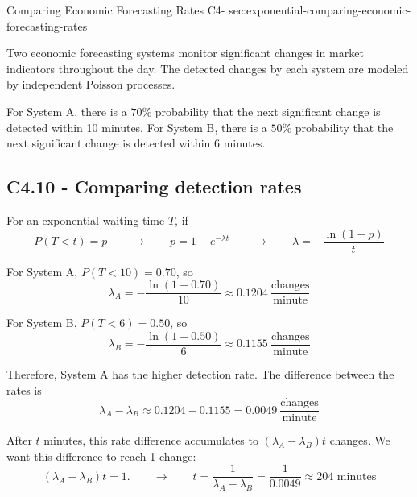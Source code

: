 	\sectionScored
	{Comparing Economic Forecasting Rates}
	{C4-}
	{sec:exponential-comparing-economic-forecasting-rates}
	{
		Two economic forecasting systems monitor significant changes in market
		indicators throughout the day. The detected changes by each system are
		modeled by independent Poisson processes.
		
		For System A, there is a \(70\%\) probability that the next significant
		change is detected within 10 minutes. For System B, there is a \(50\%\)
		probability that the next significant change is detected within
		6 minutes.
		
		
		\subsection*{C4.10 - Comparing detection rates}
		\label{subsec:c4-compare-rates-economic}
		
		For an exponential waiting time \(T\), if
		$$
		P(T<t)=p
		\qquad \longrightarrow \qquad
		p=1-e^{-\lambda t}
		\qquad \longrightarrow \qquad
		{
			\lambda=-\frac{\ln(1-p)}{t}
		}
		$$
		
		For System A, \(P(T<10)=0.70\), so
		$$
		\lambda_A
		=-\frac{\ln(1-0.70)}{10}
		\approx0.1204
		\>\frac{\text{changes}}{\text{minute}}
		$$
		
		For System B, \(P(T<6)=0.50\), so
		$$
		\lambda_B
		=-\frac{\ln(1-0.50)}{6}
		\approx0.1155
		\>\frac{\text{changes}}{\text{minute}}
		$$
		
		Therefore, System A has the higher detection rate. The difference
		between the rates is
		$$
		\lambda_A-\lambda_B
		\approx0.1204-0.1155
		=0.0049
		\>\frac{\text{changes}}{\text{minute}}
		$$
		
		After \(t\) minutes, this rate difference accumulates to
		$
		(\lambda_A-\lambda_B)t
		$
		changes. We want this difference to reach 1 change:
		$$
		(\lambda_A-\lambda_B)t=1.
		\qquad \longrightarrow \qquad
		t
		=\frac{1}{\lambda_A-\lambda_B}
		=\frac{1}{0.0049}
		\approx \boxed{204\text{ minutes}}
		$$
		\vspace{-5mm}
	}
	
